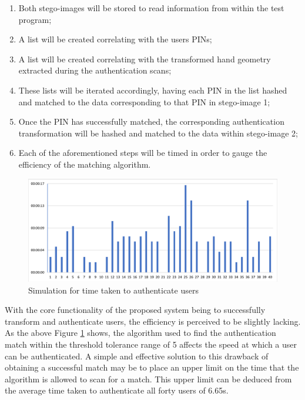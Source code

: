 \begin{enumerate}[label=\roman*.]
    \item Both stego-images will be stored to read information from within the test program;
    \item A list will be created correlating with the users PINs;
    \item A list will be created correlating with the transformed hand geometry extracted during the authentication scans;
    \item These lists will be iterated accordingly, having each PIN in the list hashed and matched to the data corresponding to that PIN in stego-image 1;
    \item Once the PIN has successfully matched, the corresponding authentication transformation will be hashed and matched to the data within stego-image 2;
    \item Each of the aforementioned steps will be timed in order to gauge the efficiency of the matching algorithm.
    
\end{enumerate}

    
    \begin{figure}[htbp!] 
    \centering    
    \includegraphics[width=1.0\textwidth]{Chapter4/Figs/AuthTest1.png}
    \caption[Simulation for time taken to authenticate users]{Simulation for time taken to authenticate users}
    \label{fig:Simulation for time taken to authenticate users}
    \end{figure}
    
With the core functionality of the proposed system being to successfully transform and authenticate users, the efficiency is perceived to be slightly lacking. As the above Figure \ref{fig:Simulation for time taken to authenticate users} shows, the algorithm used to find the authentication match within the threshold tolerance range of 5 affects the speed at which a user can be authenticated. A simple and effective solution to this drawback of obtaining a successful match may be to place an upper limit on the time that the algorithm is allowed to scan for a match. This upper limit can be deduced from the average time taken to authenticate all forty users of 6.65s. 


